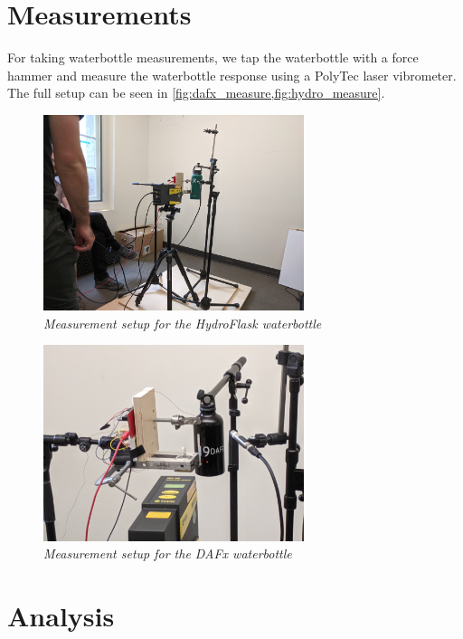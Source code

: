 \documentclass[twoside,a4paper]{article}
\begin{document}
\section{Measurements} \label{sec:measure}
%
For taking waterbottle measurements, we tap the waterbottle
with a force hammer and measure the waterbottle response
using a PolyTec laser vibrometer. The full setup can be seen
in \cref{fig:dafx_measure,fig:hydro_measure}.
%
\begin{figure}[!htb]
    \centering
    \includegraphics[width=3in]{Figures/hydroflask_measure}
    \caption{\it{Measurement setup for the HydroFlask waterbottle}}
    \label{fig:hydro_measure}
\end{figure}
%
\begin{figure}[!htb]
    \centering
    \includegraphics[width=3in]{Figures/dafx_measure}
    \caption{\it{Measurement setup for the DAFx waterbottle}}
    \label{fig:dafx_measure}
\end{figure}

\section{Analysis} \label{sec:analysis}
%
\end{document}
